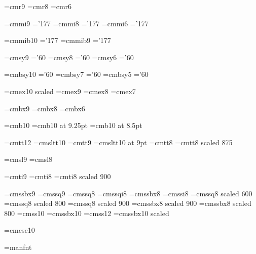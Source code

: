 \let\safetikz\shipout


\usetikzlibrary{calc}
\let\shipout\safetikz

\magnification\magstephalf
\parskip3pt
\baselineskip14pt

\font\ninerm=cmr9
\font\eightrm=cmr8
\font\sixrm=cmr6

\font\ninei=cmmi9  \skewchar\ninei='177
\font\eighti=cmmi8  \skewchar\eighti='177
\font\sixi=cmmi6  \skewchar\sixi='177

\font\tenbi=cmmib10  \skewchar\tenbi='177
\font\ninebi=cmmib9  \skewchar\ninebi='177

\font\ninesy=cmsy9  \skewchar\ninesy='60
\font\eightsy=cmsy8  \skewchar\eightsy='60
\font\sixsy=cmsy6  \skewchar\sixsy='60

\font\tenbsy=cmbsy10  \skewchar\tenbsy='60
\font\sevenbsy=cmbsy7  \skewchar\sevenbsy='60
\font\fivebsy=cmbsy5  \skewchar\fivebsy='60

\font\elevenex=cmex10 scaled\magstephalf
\font\nineex=cmex9
\font\eightex=cmex8
\font\sevenex=cmex7

\font\ninebf=cmbx9
\font\eightbf=cmbx8
\font\sixbf=cmbx6

\font\tenthinbf=cmb10
\font\ninethinbf=cmb10 at 9.25pt
\font\eightthinbf=cmb10 at 8.5pt

\font\twelvett=cmtt12  \hyphenchar{}  %
\font\tensltt=cmsltt10  \hyphenchar{}
\font\ninett=cmtt9  \hyphenchar{}
\font\ninesltt=cmsltt10 at 9pt  \hyphenchar{}
\font\eighttt=cmtt8  \hyphenchar{}
\font\seventt=cmtt8 scaled 875  \hyphenchar{}

\font\ninesl=cmsl9
\font\eightsl=cmsl8

\font\nineit=cmti9
\font\eightit=cmti8
\font\sevenit=cmti8 scaled 900

\font\ninessbx=cmssbx9
\font\niness=cmssq9
\font\eightss=cmssq8
\font\eightssi=cmssqi8
\font\eightssbx=cmssbx8
\font\eightssi=cmssi8
\font\fourss=cmssq8 scaled 600
\font\sixss=cmssq8 scaled 800
\font\sevenss=cmssq8 scaled 900
\font\sevenssbx=cmssbx8 scaled 900
\font\sixssbx=cmssbx8 scaled 800
\font\tenss=cmss10
\font\tenssbx=cmssbx10
\font\twelvess=cmss12
\font\titlefont=cmssbx10 scaled

\font\tencsc=cmcsc10

\font\manfnt=manfnt %

\def\ninepoint{\def\rm{\fam0\ninerm}%
  \textfont0=\ninerm \scriptfont0=\sixrm \scriptscriptfont0=\fiverm
  \textfont1=\ninei \scriptfont1=\sixi \scriptscriptfont1=\fivei
  \textfont2=\ninesy \scriptfont2=\sixsy \scriptscriptfont2=\fivesy
  \textfont3=\nineex \scriptfont3=\sevenex \scriptscriptfont3=\sevenex
  \def\it{\fam\itfam\nineit}%
  \textfont\itfam=\nineit
  \def\sl{\fam\slfam\let\ninett=\ninesltt\ninesl}%
  \textfont\slfam=\ninesl
  \def\bf{\fam\bffam\ninebf}%
  \textfont\bffam=\ninebf \scriptfont\bffam=\sixbf
   \scriptscriptfont\bffam=\fivebf
  \def\tt{\fam\ttfam\ninett}%
  \let\sltt=\error
  \textfont\ttfam=\ninett
  \def\oldstyle{\fam\@ne\ninei}%
  \normalbaselineskip=11pt\rm}

